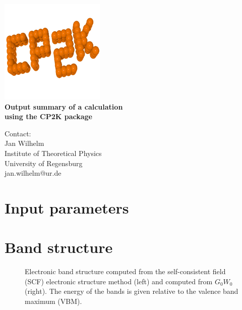 \documentclass[11pt, a4paper]{scrartcl}
\newlength\figureheight
\newlength\figurewidth
\begin{document}

\begin{titlepage}
  \sffamily
  \begin{center}
{
\includegraphics[width=5cm]{cp2k_logo.png}
\\[1em]
\Huge \bfseries Output summary of a \GW calculation\\[0.4em] using the CP2K package}
  \end{center}{\large
  \vspace{3em}
  Contact:
  \\[1em]
    Jan Wilhelm
      \\[0.5em]
    Institute of Theoretical Physics
    \\[0.5em]
    University of Regensburg
    \\[0.5em]
    jan.wilhelm@ur.de
    \\[3em]
    
\tableofcontents
  }
\end{titlepage}







\pagestyle{plain}






\pagestyle{fancy}

\section{Input parameters}


\section{Band structure}
\begin{figure}[h!]
\centering
\setlength\figureheight{11cm} 
\setlength{}

\hspace{-2.5em}
\setlength{}

\caption{Electronic band structure computed from the self-consistent field (SCF) electronic structure method (left) and computed from $G_0W_0$ (right). The energy of the bands is given relative to the valence band maximum (VBM).}
    \label{f2}
\end{figure}
\end{document}
